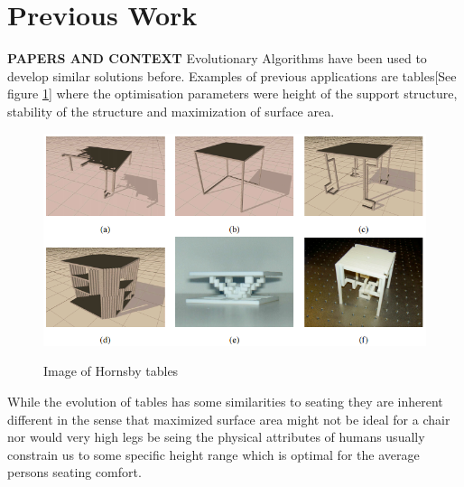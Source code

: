 \section{Previous Work}

\textbf{PAPERS AND CONTEXT}
Evolutionary Algorithms have been used to develop similar solutions before. Examples of previous  applications are tables[See figure \ref{fig:hornby_tables}] where the optimisation parameters were height of the support structure, stability of the structure and maximization of surface area.
\begin{figure}[ht]
\includegraphics[scale=.6]{content/img/tables}
\label{fig:hornby_tables}\\
\caption{Image of Hornsby tables\cite{paper:ev4} }
\end{figure}

While the evolution of tables has some similarities to seating they are inherent
different in the sense that maximized surface area might not be ideal for a
chair nor would very high legs be seing the physical attributes of humans
usually constrain us to some specific height range which is optimal for the
average persons seating comfort.

